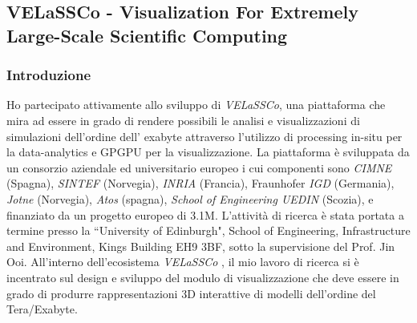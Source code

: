 \documentclass[a4paper,11pt]{paper}
\begin{document}
\subsection{VELaSSCo - Visualization For Extremely Large-Scale Scientific Computing}
\subsubsection{Introduzione}
Ho partecipato attivamente allo sviluppo di \textit{VELaSSCo}, una piattaforma che mira ad essere in grado di rendere possibili le analisi e visualizzazioni di simulazioni dell'ordine dell' exabyte attraverso l'utilizzo di processing in-situ per la data-analytics e GPGPU per la visualizzazione. La piattaforma è sviluppata da un consorzio aziendale ed universitario europeo i cui componenti sono \textit{CIMNE} (Spagna), \textit{SINTEF} (Norvegia), \textit{INRIA} (Francia), Fraunhofer \textit{IGD} (Germania), \textit{Jotne} (Norvegia), \textit{Atos} (spagna), \textit{School of Engineering UEDIN} (Scozia), e finanziato da un progetto europeo di 3.1M. 
L'attività di ricerca è stata portata a termine presso la ``University of Edinburgh", School of Engineering, Infrastructure and Environment, Kings Building EH9 3BF, sotto la supervisione del Prof. Jin Ooi. 
All'interno dell'ecosistema \textit{VELaSSCo} , il mio lavoro di ricerca si è incentrato sul design e sviluppo del modulo di visualizzazione che deve essere in grado di produrre rappresentazioni 3D interattive di modelli dell'ordine del Tera/Exabyte.
\end{document}
